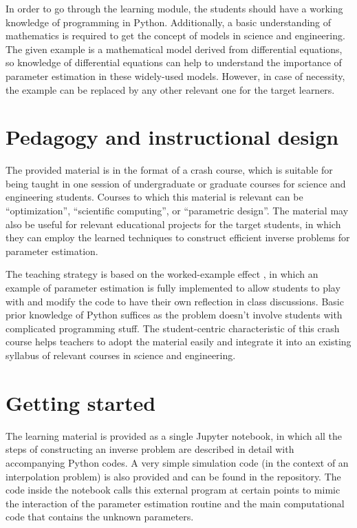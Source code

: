 In order to go through the learning module, the students should have a working knowledge of programming in Python. Additionally, a basic understanding of mathematics is required to get the concept of models in science and engineering. The given example is a mathematical model derived from differential equations, so knowledge of differential equations can help to understand the importance of parameter estimation in these widely-used models. However, in case of necessity, the example can be replaced by any other relevant one for the target learners.

\section{Pedagogy and instructional design}

The provided material is in the format of a crash course, which is suitable for being taught in one session of undergraduate or graduate courses for science and engineering students. Courses to which this material is relevant can be
``optimization'', ``scientific computing'', or ``parametric design''. The material may also be useful for relevant educational projects for the target students, in which they can employ the learned techniques to construct efficient inverse problems for parameter estimation.

The teaching strategy is based on the worked-example effect \cite{Chen2015}, in which an example of parameter estimation is fully implemented to allow students to play with and modify the code to have their own reflection in class discussions. Basic prior knowledge of Python suffices as the problem doesn't involve students with complicated programming stuff. The student-centric characteristic of this crash course helps teachers to adopt the material easily and integrate it into an existing syllabus of relevant courses in science and engineering.

\section{Getting started}

The learning material is provided as a single Jupyter notebook, in which all the steps of constructing an inverse problem are described in detail with accompanying Python codes. A very simple simulation code (in the context of an interpolation problem) is also provided and can be found in the repository. The code inside the notebook calls this external program at certain points to mimic the interaction of the parameter estimation routine and the main computational code that contains the unknown parameters.

